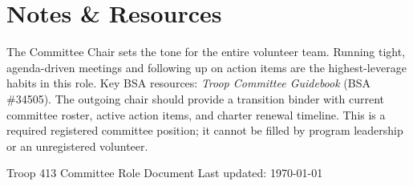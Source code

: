 \documentclass[10pt, letterpaper]{article}
\begin{document}
\vspace{0.6em}

\section{Notes \& Resources}
The Committee Chair sets the tone for the entire volunteer team. Running tight, agenda-driven meetings and following up on action items are the highest-leverage habits in this role. Key BSA resources: \textit{Troop Committee Guidebook} (BSA \#34505). The outgoing chair should provide a transition binder with current committee roster, active action items, and charter renewal timeline. This is a required registered committee position; it cannot be filled by program leadership or an unregistered volunteer.

\vfill
\begin{center}
  \footnotesize\color{gray}
  Troop 413 \textbullet{} Committee Role Document \textbullet{} Last updated: \today
\end{center}
\end{document}
